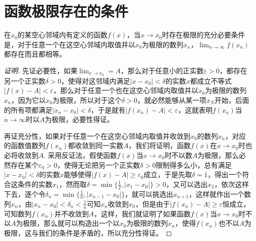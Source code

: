 
\section{函数极限存在的条件}
\label{sec:the-condition-of-function-limit-exist}

\begin{theorem}[函数极限与数列极限的关系]
  在$x_0$的某空心邻域内有定义的函数$f(x)$，当$x \to x_0$时存在极限的充分必要条件是，对于任意一个在这空心邻域内取值并以$x_0$为极限的数列$x_n$，$\lim_{n \to \infty}f(x_n)$都存在而且都相等。
\end{theorem}

\begin{proof}[证明]
  先证必要性，如果$\lim_{x \to x_0} = A$，那么对于任意小的正实数$\varepsilon > 0$，都存在另一个正实数$\delta > 0$，使得对这邻域内满足$|x-x_0|<\delta$的实数$x$都成立不等式$|f(x)-A|<\varepsilon$，那么对于任意一个也在这空心邻域内取值并以$x_0$为极限的数列$x_n$，因为它以$x_0$为极限，所以对于这个$\delta>0$，就必然能够从某一项$x_N$开始，后面的所有项都满足$|x_n-x_0|<\delta$，于是就有$|f(x_n)-A|<\varepsilon$，这就表明$f(x_n)$当$n \to \infty$时以$A$为极限，必要性得证。

  再证充分性，如果对于任意一个在这空心邻域内取值并收敛到$x_0$的数列$x_n$，对应的函数值数列$f(x_n)$都收敛到同一实数$A$，我们将证明，函数$f(x)$在$x \to x_0$时也必将收敛到$A$. 采用反证法，假使函数$f(x)$当$x \to x_0$时不以数$A$为极限，那么必然存在某个$\varepsilon_0>0$，使得无论把另一个正实数$\delta>0$限制得多么小，总有满足$|x-x_0|<\delta$的实数$x$能够使得$|f(x)-A| \geqslant \varepsilon_0$成立，于是先取$\delta=1$，得出一个符合这条件的实数$x_1$，然而取$\delta=\min\{\frac{1}{2}, |x_1-x_0|\}>0$，又可以选出$x_2$，依次这样下去，逐个令$\delta_n=\min\{\frac{1}{n}, |x_{n-1}-x_0|\}$，就可以挑选出$x_{n+1}$，这样就作出一个数列$x_n$，由$|x_n-x_0|<\delta_n<\frac{1}{n}$可知$x_n$收敛到$x_0$，但是由于$|f(x_n)-A| \geqslant \varepsilon$恒成立，可知数列$f(x_n)$并不收敛到$A$，这样，我们就证明了如果函数$f(x)$当$x \to x_0$时不以$A$为极限，那么就可以构造出一个以$x_0$为极限的数列$x_n$，使得$f(x_n)$也不以$A$为极限，这与我们的条件是矛盾的，所以充分性得证。
\end{proof}

